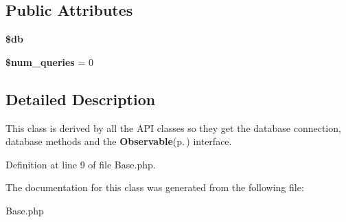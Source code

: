 \subsection*{Public Attributes}
\begin{CompactItemize}
\item 
{\bf \$db}\label{classBase_o0}

\item 
{\bf \$num\_\-queries} = 0\label{classBase_o1}

\end{CompactItemize}


\subsection{Detailed Description}
This class is derived by all the API classes so they get the database connection, database methods and the {\bf Observable}{\rm (p.\,\pageref{classObservable})} interface. 



Definition at line 9 of file Base.php.

The documentation for this class was generated from the following file:\begin{CompactItemize}
\item 
Base.php\end{CompactItemize}
